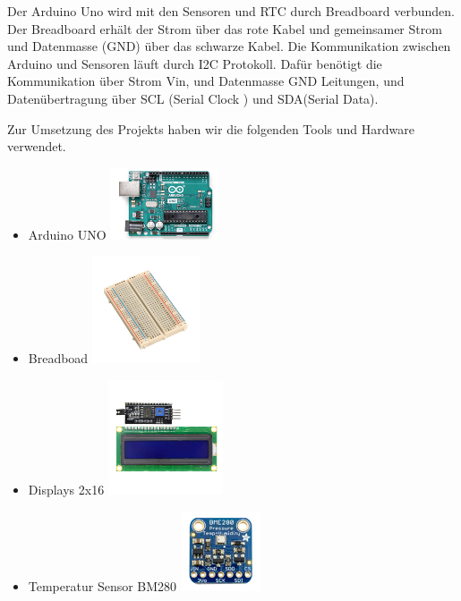 \documentclass[conference]{IEEEtran}
\begin{document}
Der Arduino Uno wird mit den Sensoren und RTC durch Breadboard verbunden. Der Breadboard erhält der Strom über das rote Kabel und gemeinsamer Strom und Datenmasse (GND) über das schwarze Kabel.  Die Kommunikation zwischen Arduino und Sensoren läuft durch I2C Protokoll. Dafür benötigt die Kommunikation über Strom Vin, und Datenmasse GND Leitungen, und Datenübertragung über SCL (Serial Clock
) und SDA(Serial Data).  

Zur Umsetzung des Projekts haben wir die folgenden Tools und Hardware verwendet.

\begin{itemize}
	\item Arduino UNO 
		\includegraphics[width=0.27\linewidth]{fig15}
	
	
\item Breadboad	
	\includegraphics[width=0.27\linewidth]{fig16}

	
\item Displays 2x16 
		\includegraphics[width=0.27\linewidth]{fig17}
	
	
\item Temperatur Sensor BM280 
 	\includegraphics[width=0.27\linewidth]{fig18}
	

\end{itemize}
\end{document}
